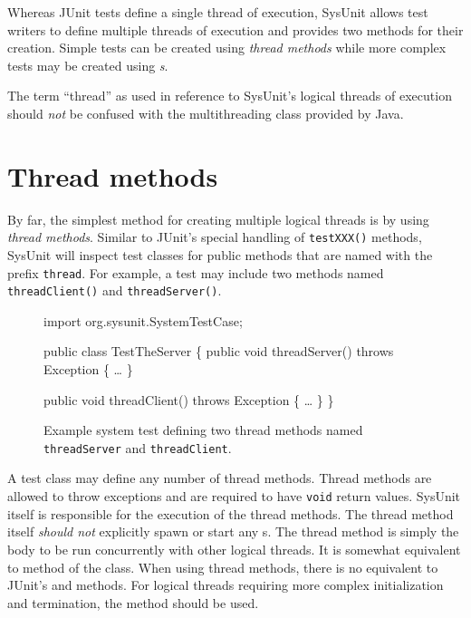 Whereas JUnit tests define a single thread of execution, SysUnit
allows test writers to define multiple threads of execution and
provides two methods for their creation.  Simple tests can be
created using \emph{thread methods} while more complex
tests may be created using \emph{s}.

\begin{note}
The term ``thread'' as used in reference to SysUnit's logical
threads of execution should \emph{not} be confused with
the  multithreading class provided
by Java.
\end{note}

\section{Thread methods}

By far, the simplest method for creating multiple logical threads
is by using \emph{thread methods}.  Similar to JUnit's
special handling of \texttt{testXXX()} methods, SysUnit will
inspect test classes for public methods that are named with
the prefix \texttt{thread}.  For example, a test may include
two methods named \texttt{threadClient()} and \texttt{threadServer()}.

\begin{figure}
\begin{codelisting}
import org.sysunit.SystemTestCase;

public class TestTheServer
\{
    public void threadServer()
        throws Exception 
    \{
         \dots
    \}

    public void threadClient()
        throws Exception 
    \{
         \dots
    \}
\}
\end{codelisting}
\caption{Example system test defining two thread methods named
\texttt{threadServer} and \texttt{threadClient}.}
\end{figure}

A test class may define any number of thread methods.  Thread methods
are allowed to throw exceptions and are required to have \texttt{void}
return values.  SysUnit itself is responsible for the execution of
the thread methods.  The thread method itself \emph{should not}
explicitly spawn or start any s.  The thread method is
simply the body to be run concurrently with other logical threads.
It is somewhat equivalent to  method of the
 class.  When using thread methods, there is no
equivalent to JUnit's  and  
methods.  For logical threads requiring more complex initialization
and termination, the  method should be used.

